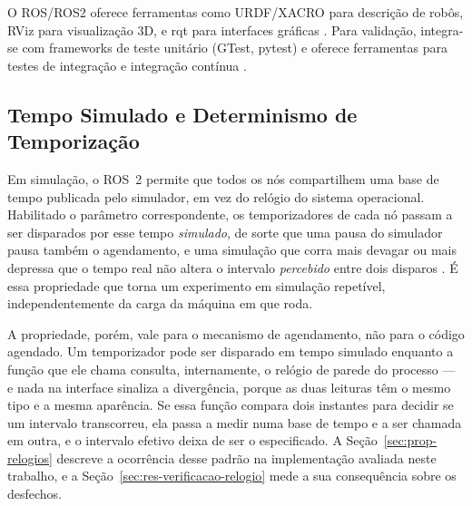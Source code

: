 O ROS/ROS2 oferece ferramentas como URDF/XACRO para descrição de robôs, RViz para visualização 3D, e rqt para interfaces gráficas \cite{Joseph2018, Macenski2022}. Para validação, integra-se com frameworks de teste unitário (GTest, pytest) e oferece ferramentas para testes de integração e integração contínua \cite{Joseph2018, Macenski2022}.

\subsection{Tempo Simulado e Determinismo de Temporização}
\label{sec:fund-relogios}

Em simulação, o \ac{ROS}~2 permite que todos os nós compartilhem uma base de tempo
publicada pelo simulador, em vez do relógio do sistema operacional. Habilitado o
parâmetro correspondente, os temporizadores de cada nó passam a ser disparados por esse
tempo \emph{simulado}, de sorte que uma pausa do simulador pausa também o agendamento, e
uma simulação que corra mais devagar ou mais depressa que o tempo real não altera o
intervalo \emph{percebido} entre dois disparos \cite{Macenski2022}. É essa propriedade que
torna um experimento em simulação repetível, independentemente da carga da máquina em que
roda.

A propriedade, porém, vale para o mecanismo de agendamento, não para o código agendado.
Um temporizador pode ser disparado em tempo simulado enquanto a função que ele chama
consulta, internamente, o relógio de parede do processo --- e nada na interface sinaliza a
divergência, porque as duas leituras têm o mesmo tipo e a mesma aparência. Se essa função
compara dois instantes para decidir se um intervalo transcorreu, ela passa a medir numa
base de tempo e a ser chamada em outra, e o intervalo efetivo deixa de ser o
especificado. A Seção~\ref{sec:prop-relogios} descreve a ocorrência desse padrão na
implementação avaliada neste trabalho, e a Seção~\ref{sec:res-verificacao-relogio} mede a sua
consequência sobre os desfechos.